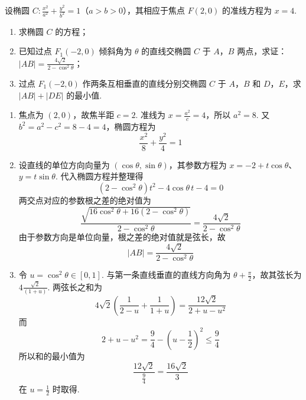 \begin{problem}
设椭圆 \(C: \frac{x^2}{a^2} + \frac{y^2}{b^2} = 1\)（\(a > b > 0\)），其相应于焦点 \(F(2,0)\) 的准线方程为 \(x = 4\).

\begin{enumerate}
\item 求椭圆 \(C\) 的方程；
\item 已知过点 \(F_{1}(-2,0)\) 倾斜角为 \(\theta\) 的直线交椭圆 \(C\) 于 \(A\)，\(B\) 两点，求证：\(|AB| = \frac{4\sqrt{2}}{2 - \cos^2\theta}\)；
\item 过点 \(F_{1}(-2,0)\) 作两条互相垂直的直线分别交椭圆 \(C\) 于 \(A\)，\(B\) 和 \(D\)，\(E\)，求 \(|AB| + |DE|\) 的最小值.
\end{enumerate}
\end{problem}

\begin{solution}
\begin{enumerate}
\item 焦点为 \((2,0)\)，故焦半距 \(c=2\). 准线为 \(x=\frac{a^2}{c}=4\)，所以 \(a^2=8\). 又 \(b^2=a^2-c^2=8-4=4\)，椭圆方程为
\[
\frac{x^2}{8}+\frac{y^2}{4}=1
\]
\item 设直线的单位方向向量为 \((\cos\theta,\sin\theta)\)，其参数方程为 \(x=-2+t\cos\theta\)、\(y=t\sin\theta\). 代入椭圆方程并整理得
\[
(2-\cos^2\theta)t^2-4\cos\theta\,t-4=0
\]
两交点对应的参数根之差的绝对值为
\[
\frac{\sqrt{16\cos^2\theta+16(2-\cos^2\theta)}}{2-\cos^2\theta}
=\frac{4\sqrt2}{2-\cos^2\theta}
\]
由于参数方向是单位向量，根之差的绝对值就是弦长，故
\[
|AB|=\frac{4\sqrt2}{2-\cos^2\theta}
\]
\item 令 \(u=\cos^2\theta\in[0,1]\). 与第一条直线垂直的直线方向角为 \(\theta+\frac{\pi}{2}\)，故其弦长为 \(4\frac{\sqrt2}{(1+u)}\). 两弦长之和为
\[
4\sqrt2\left(\frac1{2-u}+\frac1{1+u}\right)
=\frac{12\sqrt2}{2+u-u^2}
\]
而
\[
2+u-u^2=\frac94-\left(u-\frac12\right)^2\leqslant\frac94
\]
所以和的最小值为
\[
\frac{12\sqrt2}{\frac{9}{4}}=\frac{16\sqrt2}{3}
\]
在 \(u=\frac{1}{2}\) 时取得.
\end{enumerate}
\end{solution}
